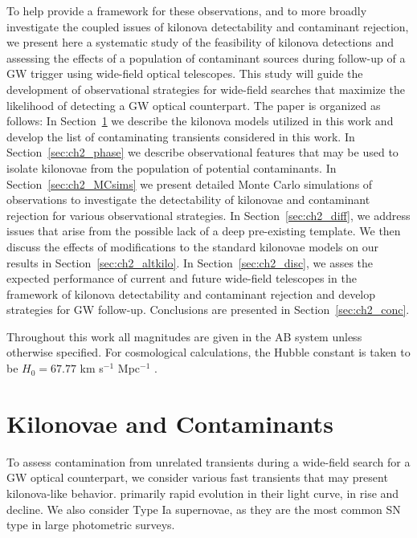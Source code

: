 To help provide a framework for these observations, and to more broadly investigate the coupled issues of kilonova detectability and contaminant rejection, we present here a systematic study of the feasibility of kilonova detections and assessing the effects of a population of contaminant sources during follow-up of a GW trigger using wide-field optical telescopes. This study will guide the development of observational strategies for wide-field searches that maximize the likelihood of detecting a GW optical counterpart. The paper is organized as follows: In Section~\ref{sec:ch2_contaminants} we describe the kilonova models utilized in this work and develop the list of contaminating transients considered in this work. In Section~\ref{sec:ch2_phase} we  describe observational features that may be used to isolate kilonovae from the population of potential contaminants. In Section~\ref{sec:ch2_MCsims} we present detailed Monte Carlo simulations of observations to investigate the detectability of kilonovae and contaminant rejection for various observational strategies. In Section~\ref{sec:ch2_diff}, we address issues that arise from the possible lack of a deep pre-existing template. We then discuss the effects of modifications to the standard kilonovae models on our results in Section~\ref{sec:ch2_altkilo}. In Section~\ref{sec:ch2_disc}, we asses the expected performance of current and future wide-field telescopes in the framework of kilonova detectability and contaminant rejection and develop strategies for GW follow-up. Conclusions are presented in Section~\ref{sec:ch2_conc}.

Throughout this work all magnitudes are given in the AB system unless otherwise specified. For cosmological calculations, the Hubble constant is taken to be $H_0 = 67.77$ km s$^{-1}$ Mpc$^{-1}$ \citep{Planck2014}.

\section{Kilonovae and Contaminants}
\label{sec:ch2_contaminants}

To assess contamination from unrelated transients during a wide-field search for a GW optical counterpart, we consider various fast transients that may present kilonova-like behavior. primarily rapid evolution in their light curve, in rise and decline. We also consider Type Ia supernovae, as they are the most common SN type in large photometric surveys.

